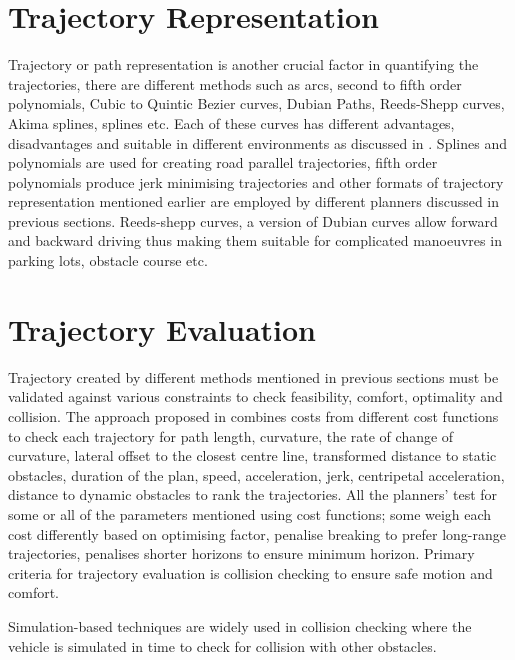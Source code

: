 \section{Trajectory Representation}
\label{trajrep}
Trajectory or path representation is another crucial factor in quantifying the trajectories, there are different methods such as arcs, second to fifth order polynomials, Cubic to Quintic Bezier curves, Dubian Paths, Reeds-Shepp curves, Akima splines, splines etc. Each of these curves has different advantages, disadvantages and suitable in different environments as discussed in \cite{motion_planning_techniques}. Splines and polynomials are used for creating road parallel trajectories, fifth order polynomials produce jerk minimising trajectories\cite{werling_frenet} and other formats of trajectory representation mentioned earlier are employed by different planners discussed in previous sections. Reeds-shepp curves, a version of Dubian curves allow forward and backward driving \cite{reedsshepp} thus making them suitable for complicated manoeuvres in parking lots, obstacle course etc.


\section{Trajectory Evaluation}
\label{traj_eval}
Trajectory created by different methods mentioned in previous sections must be validated against various constraints to check feasibility, comfort, optimality and collision. The approach proposed in \cite{traj_planner_optimization} combines costs from different cost functions to check each trajectory for path length, curvature, the rate of change of curvature, lateral offset to the closest centre line, transformed distance to static obstacles, duration of the plan, speed, acceleration, jerk, centripetal acceleration, distance to dynamic obstacles to rank the trajectories. All the planners' test for some or all of the parameters mentioned using cost functions; some weigh each cost differently based on optimising factor, \cite{unit_A_star} penalise breaking to prefer long-range trajectories, \cite{cmu_parallel_thesis} penalises shorter horizons to ensure minimum horizon. Primary criteria for trajectory evaluation is collision checking to ensure safe motion and comfort.

Simulation-based techniques are widely used in collision checking where the vehicle is simulated in time to check for collision with other obstacles.

